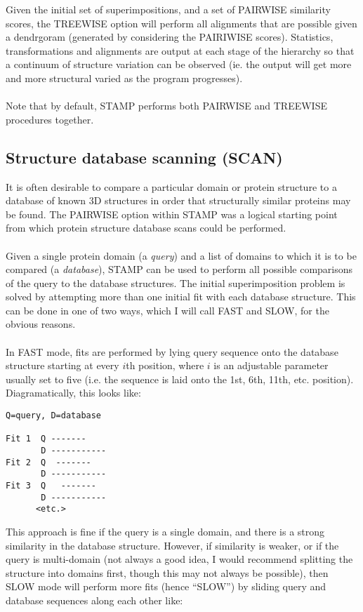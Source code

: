 Given the initial set of superimpositions, and a set of
PAIRWISE similarity scores, the TREEWISE option will
perform all alignments that are possible given a dendrgoram (generated 
by considering the PAIRIWISE scores). 
Statistics, transformations and alignments are output at each stage
of the hierarchy so that a continuum of structure variation can be
observed (ie. the output will get more and more structural varied
as the program progresses).\\
\\
Note that by default, STAMP performs both PAIRWISE and TREEWISE procedures together.

\subsection{Structure database scanning (SCAN)}

It is often desirable to compare a particular domain or protein 
structure to a database of known 3D structures in order that structurally similar 
proteins may be found.  The PAIRWISE option within STAMP was a
logical starting point from which protein structure database scans
could be performed.\\
\\
Given a single protein domain (a {\em query}) and a list of domains to which it is
to be compared (a {\em database}), STAMP can be used to perform all possible
comparisons of the query to the database structures.  The initial
superimposition problem is solved by attempting more than one
initial fit with each database structure.    This can be done in one of two ways,
which I will call FAST and SLOW, for the obvious reasons.\\
\\
In FAST mode, fits are performed by lying
query sequence onto the database structure starting at every $i$th position,
where $i$ is an adjustable parameter usually set to five (i.e. the sequence
is laid onto the 1st, 6th, 11th, etc. position).   Diagramatically, this looks
like:\\

\begin{verbatim}
Q=query, D=database

Fit 1  Q -------
       D -----------
Fit 2  Q  -------
       D -----------
Fit 3  Q   -------
       D -----------
      <etc.>
\end{verbatim}

This approach is fine if the query is a single domain, and there is a strong similarity in
the database structure.  However, if similarity is weaker, or if the query is multi-domain (not
always a good idea, I would recommend splitting the structure into domains first, though this
may not always be possible), then SLOW mode will perform more fits (hence ``SLOW'') by sliding
query and database sequences along each other like:\\

